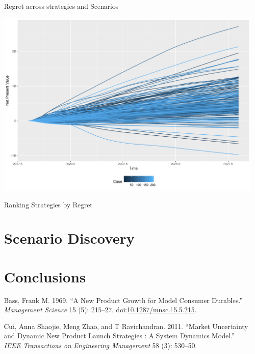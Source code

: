\documentclass[12pt,ignorenonframetext,]{beamer}
\begin{document}
\begin{frame}{Regret across strategies and Scenarios}

\begin{center}\includegraphics{dmdu-presentation_files/figure-beamer/unnamed-chunk-5-1} \end{center}

\end{frame}

\begin{frame}{Ranking Strategies by Regret}

\end{frame}

\section{Scenario Discovery}\label{scenario-discovery}

\section*{Conclusions}\label{conclusions}

\hypertarget{refs}{}
\hypertarget{ref-Bass1969}{}
Bass, Frank M. 1969. ``A New Product Growth for Model Consumer
Durables.'' \emph{Management Science} 15 (5): 215--27.
doi:\href{https://doi.org/10.1287/mnsc.15.5.215}{10.1287/mnsc.15.5.215}.

\hypertarget{ref-Cui2011}{}
Cui, Anna Shaojie, Meng Zhao, and T Ravichandran. 2011. ``Market
Uncertainty and Dynamic New Product Launch Strategies : A System
Dynamics Model.'' \emph{IEEE Transactions on Engineering Management} 58
(3): 530--50.
\end{document}
